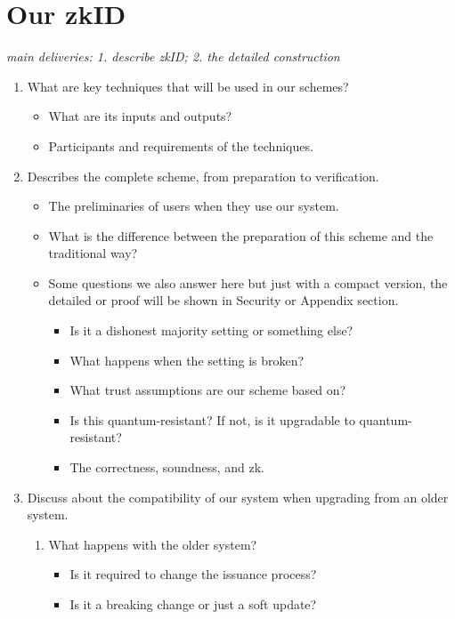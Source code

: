 \documentclass{iacrtrans}
\begin{document}
\section{Our zkID}
\label{sec:contribution}
\textit{main deliveries: 1. describe zkID; 2. the detailed construction}

\begin{enumerate}
    \item What are key techniques that will be used in our schemes?
    \begin{itemize}
        \item What are its inputs and outputs?
        \item Participants and requirements of the techniques.
    \end{itemize}
    \item Describes the complete scheme, from preparation to verification. 
    \begin{itemize}
        \item The preliminaries of users when they use our system.
        \item What is the difference between the preparation of this scheme and the traditional way?
        \item Some questions we also answer here but just with a compact version, the detailed or proof will be shown in Security or Appendix section.
        \begin{itemize}
            \item Is it a dishonest majority setting or something else? 
            \item What happens when the setting is broken?
            \item What trust assumptions are our scheme based on?
            \item Is this quantum-resistant? If not, is it upgradable to quantum-resistant?
            \item The correctness, soundness, and zk.
        \end{itemize}
    \end{itemize}
    \item Discuss about the compatibility of our system when upgrading from an older system.
    \begin{enumerate}
        \item What happens with the older system?
        \begin{itemize}
            \item Is it required to change the issuance process? 
            \item Is it a breaking change or just a soft update?

\end{itemize}
\end{enumerate}
\end{enumerate}
\end{document}
